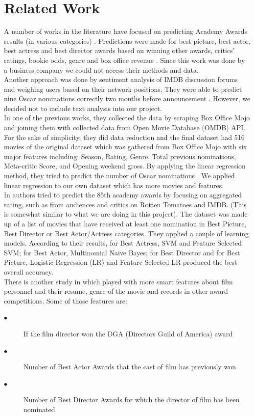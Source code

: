 \documentclass[journal,transmag]{IEEEtran}
\begin{document}
	\section{Related Work}
	A number of works in the literature have focused on predicting Academy Awards results (in various categories) \cite{ref1, ref2, ref3}. Predictions were made for best picture, best actor, best actress and best director awards based on winning other awards, critics' ratings, bookie odds, genre and box office revenue \cite{ref1}. Since this work was done by a business company we could not access their methods and data.\\
Another approach was done by sentiment analysis of IMDB discussion forums and weighing users based on their network positions. They were able to predict nine Oscar nominations correctly two months before announcement \cite{ref2}. However, we decided not to include text analysis into our project.\\
In one of the previous works, they collected the data by scraping Box Office Mojo and joining them with collected data from Open Movie Database (OMDB) API. For the sake of simplicity, they did data reduction and the final dataset had 516 movies of the original dataset which was gathered from Box Office Mojo with six major features including: Season, Rating, Genre, Total previous nominations, Meta-critic Score, and Opening weekend gross. By applying the linear regression method, they tried to predict the number of Oscar nominations \cite{ref3}. We applied linear regression to our own dataset which has more movies and features.\\
In \cite{ref4} authors tried to predict the 85th academy awards by focusing on aggregated rating, such as from audiences and critics on Rotten Tomatoes and IMDB. (This is somewhat similar to what we are doing in this project). The dataset was made up of a list of movies that have received at least one nomination in Best Picture, Best Director or Best Actor/Actress categories. They applied a couple of learning models. According to their results, for Best Actress, SVM and Feature Selected SVM; for Best Actor, Multinomial Naive Bayes; for Best Director and for Best Picture, Logistic Regression (LR) and Feature Selected LR produced the best overall accuracy.\\
There is another study in \cite{ref5} which played with more smart features about film personnel and their resume, genre of the movie and records in other award competitions. Some of those features are:
\begin{description}
  \item[$\bullet$ ] If the film director won the DGA (Directors Guild of America) award
  \item[$\bullet$ ] Number of Best Actor Awards that the cast of film has previously won
  \item[$\bullet$] Number of Best Director Awards for which the director of film has been nominated
\end{description}
\end{document}
